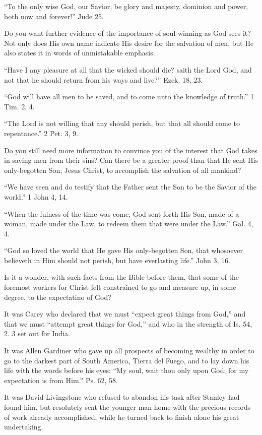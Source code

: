 \documentclass[
]{book}
\begin{document}
``To the only wise God, our Savior, be glory and majesty, dominion and power, both now and forever!'' Jude 25.

Do you want further evidence of the importance of soul-winning as God sees it? Not only does His own name indicate His desire for the salvation of men, but He also states it in words of unmistakable emphasis.

``Have I any pleasure at all that the wicked should die? saith the Lord God, and not that he should return from his ways and live?'' Ezek. 18, 23.

``God will have all men to be saved, and to come unto the knowledge of truth.'' 1 Tim. 2, 4.

``The Lord is not willing that any should perish, but that all should come to repentance.'' 2 Pet. 3, 9.

Do you still need more information to convince you of the interest that God takes in saving men from their sins? Can there be a greater proof than that He sent His only-begotten Son, Jesus Christ, to accomplish the salvation of all mankind?

``We have seen and do testify that the Father sent the Son to be the Savior of the world.'' 1 John 4, 14.

``When the fulness of the time was come, God sent forth His Son, made of a woman, made under the Law, to redeem them that were under the Law.'' Gal. 4, 4.

``God so loved the world that He gave His only-begotten Son, that whosoever believeth in Him should not perish, but have everlasting life.'' John 3, 16.

Is it a wonder, with such facts from the Bible before them, that some of the foremost workers for Christ felt constrained to go and measure up, in some degree, to the expectatino of God?

It was Carey who declared that we must ``expect great things from God,'' and that we must ``attempt great things for God,'' and who in the strength of Is. 54, 2. 3 set out for India.

It was Allen Gardiner who gave up all prospects of becoming wealthy in order to go to the darkest part of South America, Tierra del Fuego, and to lay down his life with the words before his eyes: ``My soul, wait thou only upon God; for my expectation is from Him.'' Ps. 62, 58.

It was David Livingstone who refused to abandon his task after Stanley had found him, but resolutely sent the younger man home with the precious records of work already accomplished, while he turned back to finish alone his great undertaking.
\end{document}
